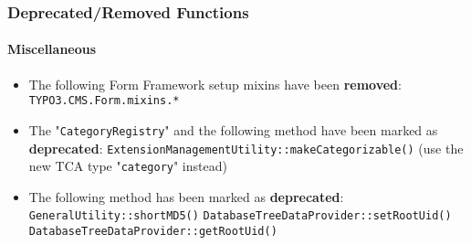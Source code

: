 %

\begin{frame}[fragile]
	\frametitle{Deprecated/Removed Functions}
	\framesubtitle{Miscellaneous}


	\begin{itemize}
		\item The following Form Framework setup mixins have been \textbf{removed}:\newline
			\small\texttt{TYPO3.CMS.Form.mixins.*}\normalsize
		\item The "\texttt{CategoryRegistry}" and the following method have been
			marked as \textbf{deprecated}:\newline
			\texttt{ExtensionManagementUtility::makeCategorizable()}\newline
			\small(use the new TCA type "\texttt{category}" instead)\normalsize
		\item The following method has been marked as \textbf{deprecated}:\newline
			\small
				\texttt{GeneralUtility::shortMD5()}\newline
				\texttt{DatabaseTreeDataProvider::setRootUid()}\newline
				\texttt{DatabaseTreeDataProvider::getRootUid()}
			\normalsize
	\end{itemize}

\end{frame}

